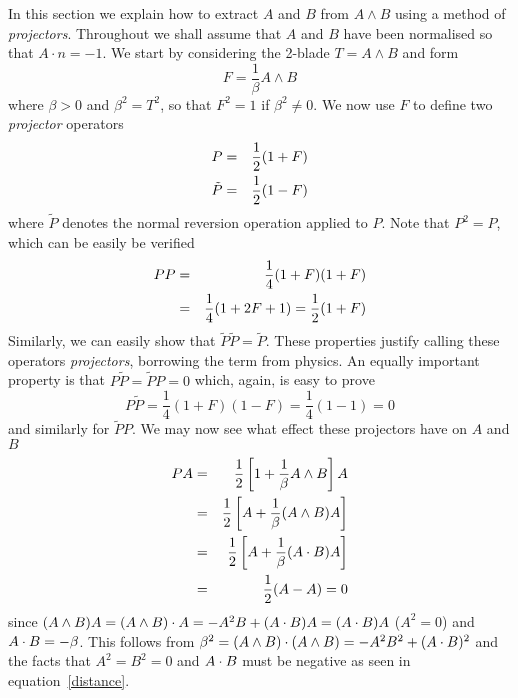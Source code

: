 In this section we explain how to extract $A$ and $B$ from
$A\wedge B$ using a method of \emph{projectors}. Throughout we shall assume
that $A$ and $B$ have been normalised so that $A\cdot n = -1$.
We start by considering the 2-blade $T = A\wedge B$ and form
%
\begin{equation}
  F = \frac{1}{\beta} A\wedge B
\end{equation}
%
where $\beta>0$ and ${\beta}^2 = T^2$, so that $F^2 = 1$
if $\beta^2 \ne 0$. We now use $F$ to define two
\emph{projector} operators
%
\begin{eqnarray}
   P & = & \frac{1}{2}(1+F) \nonumber \\
   \tilde{P} & = & \frac{1}{2}(1-F)
\end{eqnarray}
%
where $\tilde{P}$ denotes the normal reversion operation applied to
$P$. Note that $P^2 = P$, which can be easily be verified
%
\begin{eqnarray}
  PP & = & \frac{1}{4}(1+F)(1+F) \nonumber \\
     & = & \frac{1}{4}(1+2F + 1) = \frac{1}{2}(1+F)
\end{eqnarray}
%
Similarly, we can easily show that $\tilde{P}\tilde{P} =
\tilde{P}$. These properties justify calling these
operators \emph{projectors}, borrowing the term from physics. 
An equally important property is that $P\tilde{P}=\tilde{P}P = 0$
which, again, is easy to prove
%
\begin{equation}
   P\tilde{P} = \frac{1}{4}(1+F)(1-F)= \frac{1}{4}(1-1)=0
\end{equation}
%
and similarly for $\tilde{P}P$. We may now see what effect
these projectors have on $A$ and $B$
%
\begin{eqnarray}
 PA & = & \frac{1}{2}\left[1+\frac{1}{\beta}A\wedge
 B\right]A \nonumber \\
   & = & \frac{1}{2} \left[A + \frac{1}{\beta}(A\wedge
 B)A \right] \nonumber \\
  & = & \frac{1}{2}\left[ A + \frac{1}{\beta}(A\cdot
  B)A\right]
  \nonumber \\
  & = & \frac{1}{2} (A - A) = 0
\end{eqnarray}
%
since $(A\wedge B)A=(A\wedge B)\cdot A = -A^2B+(A\cdot B)A=(A\cdot
B)A$ ($A^2=0$) and  $A\cdot B = -\beta$. This follows
from $\beta^2 = (A\wedge B)\cdot (A\wedge B) = -A^2B^2 +
(A\cdot B)^2$ and the facts that $A^2 = B^2 = 0$ and $A\cdot
B$ must be negative as seen in equation~\ref{distance}.

